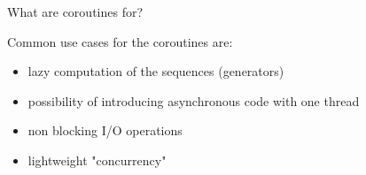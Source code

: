 \documentclass[10pt]{beamer}
\begin{document}
\begin{frame}{What are coroutines for?}
\centerline{Common use cases for the coroutines are:}
      \begin{itemize}[<+- |alert@+>]
        \item lazy computation of the sequences (generators)
        \item possibility of introducing asynchronous code with one thread
        \item non blocking I/O operations
        \item lightweight "concurrency"
      \end{itemize}
\end{frame}


\end{document}
